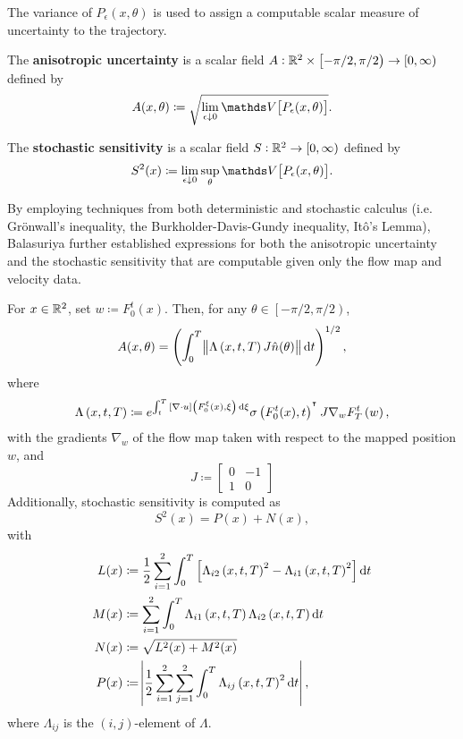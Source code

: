 The variance of \(P_\epsilon\left(x,\theta\right)\) is used to assign a computable scalar measure of uncertainty to the trajectory.

\begin{definition}
	\begin{alpharate}
		\item The \textbf{anisotropic uncertainty} is a scalar field \(A: \mathbb{R}^2\times\left[-\pi/2, \pi/2\right) \to [0,\infty)\) defined by
		\[
			A(x,\theta) \coloneqq \sqrt{\lim_{\epsilon\downarrow 0}\var{P_\epsilon(x,\theta)}}.
		\]

		\item The \textbf{stochastic sensitivity} is a scalar field \(S: \mathbb{R}^2 \to [0,\infty)\) defined by
		\[
			S^2(x) \coloneqq \lim_{\epsilon\downarrow 0}\sup_{\theta}{\var{P_\epsilon(x,\theta)}}.
		\]
	\end{alpharate}
\end{definition}

By employing techniques from both deterministic and stochastic calculus (i.e. Gr\"onwall's inequality, the Burkholder-Davis-Gundy inequality, It\^o's Lemma), Balasuriya further established expressions for both the anisotropic uncertainty and the stochastic sensitivity that are computable given only the flow map and velocity data.

\begin{theorem}\label{thm:orig_s2_calculation}
	For \(x \in \mathbb{R}^2\), set \(w \coloneqq F_0^t(x)\).
	Then, for any \(\theta \in \left[-\pi/2, \pi/2\right)\),
	\[
		A(x,\theta) = \left(\int_0^T{\norm{\Lambda\left(x, t, T\right)J\hat{n}(\theta)}\dif t}\right)^{1/2},
	\]
	where
	\[
		\Lambda\left(x,t,T\right) \coloneqq e^{\int_t^T{\left[\nabla \cdot u\right]\left(F_0^\xi(x), \xi\right)\dif\xi}}\sigma\left(F_0^t(x), t\right)^{\T}J \nabla_w F_T^t\left(w\right),
	\]
	with the gradients \(\nabla_w\) of the flow map taken with respect to the mapped position \(w\), and
	\[
		J \coloneqq \begin{bmatrix}
			0 & -1 \\
			1 & 0
		\end{bmatrix}
	\]
	Additionally, stochastic sensitivity is computed as
	\[
		S^2(x) = P(x) + N(x),
	\]
	with
	\begin{align*}
		L(x) & \coloneqq \frac12\sum_{i=1}^2\int_0^T\left[\Lambda_{i2}\left(x,t, T\right)^2 - \Lambda_{i1}\left(x,t,T\right)^2\right]\dif t \\
		M(x) & \coloneqq \sum_{i=1}^2\int_0^T{\Lambda_{i1}\left(x,t,T\right)\Lambda_{i2}\left(x,t,T\right)\dif t}                           \\
		N(x) & \coloneqq \sqrt{L^2(x) + M^2(x)}                                                                                             \\
		P(x) & \coloneqq \abs{\frac12\sum_{i=1}^2\sum_{j=1}^2{\int_0^T{\Lambda_{ij}\left(x,t,T\right)^2\dif t}}},
	\end{align*}
	where \(\Lambda_{ij}\) is the \((i,j)\)-element of \(\Lambda\).
\end{theorem}



